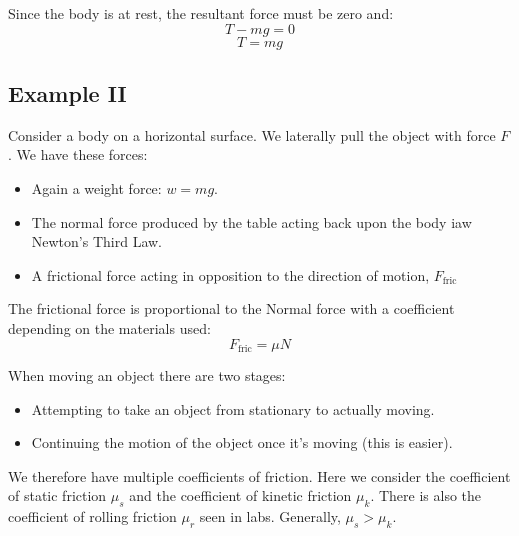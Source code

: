 Since the body is at rest, the resultant force must be zero and:
\[
    T - mg = 0
\]
\[
    T = mg
\]

\subsection{Example II}
Consider a body on a horizontal surface. We laterally pull the object with force $F$. We have these forces:
\begin{itemize}
    \item Again a weight force: $w = mg$.
    \item The normal force produced by the table acting back upon the body iaw Newton's Third Law.
    \item A frictional force acting in opposition to the direction of motion, $F_\text{fric}$
\end{itemize}

The frictional force is proportional to the Normal force with a coefficient depending on the materials used:
\[
    F_\text{fric} = \mu N
\]

When moving an object there are two stages:
\begin{itemize}
    \item Attempting to take an object from stationary to actually moving.
    \item Continuing the motion of the object once it's moving (this is easier).
\end{itemize}

We therefore have multiple coefficients of friction. Here we consider the coefficient of static friction $\mu_s$ and the coefficient of kinetic friction $\mu_k$. There is also the coefficient of rolling friction $\mu_r$ seen in labs. Generally, $\mu_s > \mu_k$.